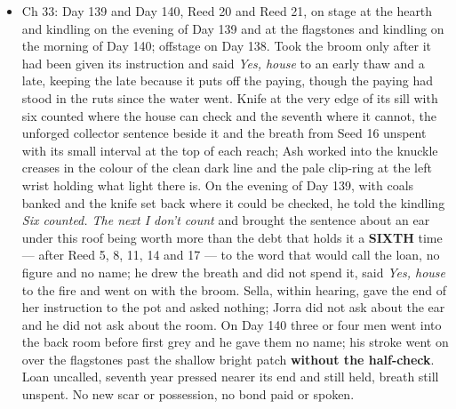 \documentclass{design/chronicle}
\begin{document}
{\begin{itemize}[leftmargin=1.4em,itemsep=1pt,topsep=3pt,parsep=0pt]
\item Ch 33: Day 139 and Day 140, Reed 20 and Reed 21, on stage at the hearth and kindling on the evening of Day 139 and at the flagstones and kindling on the morning of Day 140; offstage on Day 138. Took the broom only after it had been given its instruction and said \emph{Yes, house} to an early thaw and a late, keeping the late because it puts off the paying, though the paying had stood in the ruts since the water went. Knife at the very edge of its sill with six counted where the house can check and the seventh where it cannot, the unforged collector sentence beside it and the breath from Seed 16 unspent with its small interval at the top of each reach; Ash worked into the knuckle creases in the colour of the clean dark line and the pale clip-ring at the left wrist holding what light there is. On the evening of Day 139, with coals banked and the knife set back where it could be checked, he told the kindling \emph{Six counted. The next I don’t count} and brought the sentence about an ear under this roof being worth more than the debt that holds it a \textbf{SIXTH} time --- after Reed 5, 8, 11, 14 and 17 --- to the word that would call the loan, no figure and no name; he drew the breath and did not spend it, said \emph{Yes, house} to the fire and went on with the broom. Sella, within hearing, gave the end of her instruction to the pot and asked nothing; Jorra did not ask about the ear and he did not ask about the room. On Day 140 three or four men went into the back room before first grey and he gave them no name; his stroke went on over the flagstones past the shallow bright patch \textbf{without the half-check}. Loan uncalled, seventh year pressed nearer its end and still held, breath still unspent. No new scar or possession, no bond paid or spoken.

\end{itemize}

\begin{itemize}[leftmargin=1.4em,itemsep=1pt,topsep=3pt,parsep=0pt]


\end{itemize}}
\end{document}
